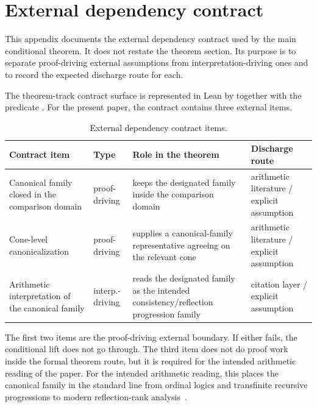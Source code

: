 \section{External dependency contract}\label{app:external-contract}

This appendix documents the external dependency contract used by the main conditional theorem. It does not restate the theorem section. Its purpose is to separate proof-driving external assumptions from interpretation-driving ones and to record the expected discharge route for each.

The theorem-track contract surface is represented in Lean by  together with the predicate . For the present paper, the contract contains three external items.

\begin{table}[ht]
\caption{External dependency contract items.}
\label{tab:external-contract}
\centering
\small
\begin{tabularx}{\textwidth}{@{}X l X X@{}}
\toprule
Contract item & Type & Role in the theorem & Discharge route \\
\midrule
Canonical family closed in the comparison domain & proof-driving & keeps the designated family inside the comparison domain & arithmetic literature / explicit assumption \\[6pt]
Cone-level canonicalization & proof-driving & supplies a canonical-family representative agreeing on the relevant cone & arithmetic literature / explicit assumption \\[6pt]
Arithmetic interpretation of the canonical family & interp.-driving & reads the designated family as the intended consistency/reflection progression family & citation layer / explicit assumption \\
\bottomrule
\end{tabularx}
\end{table}

The first two items are the proof-driving external boundary. If either fails, the conditional lift does not go through. The third item does not do proof work inside the formal theorem route, but it is required for the intended arithmetic reading of the paper. For the intended arithmetic reading, this places the canonical family in the standard line from ordinal logics and transfinite recursive progressions to modern reflection-rank analysis~\cite{Turing1939,Feferman1962,BeklemishevReflection,PakhomovWalsh2021,MontalbanWalshConsistency}.

